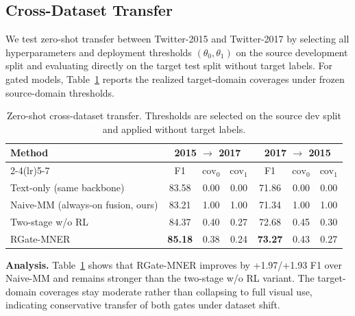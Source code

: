 \documentclass{llncs}
\begin{document}
\subsection{Cross-Dataset Transfer}
We test zero-shot transfer between Twitter-2015 and Twitter-2017 by selecting all hyperparameters and deployment thresholds $(\theta_0,\theta_1)$ on the source development split and evaluating directly on the target test split without target labels. For gated models, Table~\ref{tab:cross_dataset} reports the realized target-domain coverages under frozen source-domain thresholds.
\FloatBarrier
\begin{table}[!htbp]
\caption{Zero-shot cross-dataset transfer. Thresholds are selected on the source dev split and applied without target labels.}
\centering
\footnotesize
\setlength{\tabcolsep}{4pt}
\renewcommand{\arraystretch}{0.95}
\begin{tabular}{lcccccc}
\toprule
\multirow{2}{*}{Method} & \multicolumn{3}{c}{2015 $\rightarrow$ 2017} & \multicolumn{3}{c}{2017 $\rightarrow$ 2015} \\
\cmidrule(lr){2-4}\cmidrule(lr){5-7}
 & F1 & $\mathrm{cov}_0$ & $\mathrm{cov}_1$ & F1 & $\mathrm{cov}_0$ & $\mathrm{cov}_1$ \\
\midrule
Text-only (same backbone) & 83.58 & 0.00 & 0.00 & 71.86 & 0.00 & 0.00 \\
Naive-MM (always-on fusion, ours) & 83.21 & 1.00 & 1.00 & 71.34 & 1.00 & 1.00 \\
Two-stage w/o RL & 84.37 & 0.40 & 0.27 & 72.68 & 0.45 & 0.30 \\
RGate-MNER & \textbf{85.18} & 0.38 & 0.24 & \textbf{73.27} & 0.43 & 0.27 \\
\bottomrule
\end{tabular}
\label{tab:cross_dataset}
\end{table}
\FloatBarrier

\noindent\textbf{Analysis.}
Table~\ref{tab:cross_dataset} shows that RGate-MNER improves by +1.97/+1.93 F1 over Naive-MM and remains stronger than the two-stage w/o RL variant. The target-domain coverages stay moderate rather than collapsing to full visual use, indicating conservative transfer of both gates under dataset shift.

\FloatBarrier
\end{document}
